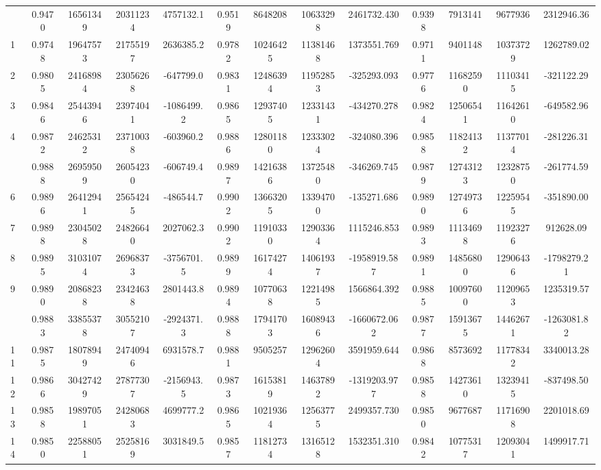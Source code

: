 \documentclass[
  12pt,
]{article}
\begin{document}
\begin{longtable}[t]{lcccccccccccc}
\endfoot
\bottomrule
\endlastfoot
0 & 0.9470 & 16561349 & 20311234 & 4757132.1 & 0.9519 & 8648208 & 10633298 & 2461732.430 & 0.9398 & 7913141 & 9677936 & 2312946.36\\
1 & 0.9748 & 19647573 & 21755197 & 2636385.2 & 0.9782 & 10246425 & 11381468 & 1373551.769 & 0.9711 & 9401148 & 10373729 & 1262789.02\\
2 & 0.9805 & 24168984 & 23056268 & -647799.0 & 0.9831 & 12486394 & 11952853 & -325293.093 & 0.9776 & 11682590 & 11103415 & -321122.29\\
3 & 0.9846 & 25443946 & 23974041 & -1086499.2 & 0.9865 & 12937405 & 12331431 & -434270.278 & 0.9824 & 12506541 & 11642610 & -649582.96\\
4 & 0.9872 & 24625312 & 23710038 & -603960.2 & 0.9886 & 12801180 & 12333024 & -324080.396 & 0.9858 & 11824132 & 11377014 & -281226.31\\
\addlinespace
5 & 0.9888 & 26959509 & 26054230 & -606749.4 & 0.9897 & 14216386 & 13725480 & -346269.745 & 0.9879 & 12743123 & 12328750 & -261774.59\\
6 & 0.9896 & 26412941 & 25654245 & -486544.7 & 0.9902 & 13663205 & 13394700 & -135271.686 & 0.9890 & 12749736 & 12259545 & -351890.00\\
7 & 0.9898 & 23045028 & 24826640 & 2027062.3 & 0.9902 & 11910330 & 12903364 & 1115246.853 & 0.9893 & 11134698 & 11923276 & 912628.09\\
8 & 0.9895 & 31031074 & 26968373 & -3756701.5 & 0.9899 & 16174274 & 14061937 & -1958919.587 & 0.9891 & 14856800 & 12906436 & -1798279.21\\
9 & 0.9890 & 20868238 & 23424638 & 2801443.8 & 0.9894 & 10770638 & 12214985 & 1566864.392 & 0.9885 & 10097600 & 11209653 & 1235319.57\\
\addlinespace
10 & 0.9883 & 33855378 & 30552107 & -2924371.3 & 0.9888 & 17941703 & 16089436 & -1660672.062 & 0.9877 & 15913675 & 14462671 & -1263081.82\\
11 & 0.9875 & 18078949 & 24740946 & 6931578.7 & 0.9881 & 9505257 & 12962604 & 3591959.644 & 0.9868 & 8573692 & 11778342 & 3340013.28\\
12 & 0.9866 & 30427429 & 27877307 & -2156943.5 & 0.9873 & 16153819 & 14637892 & -1319203.977 & 0.9858 & 14273610 & 13239415 & -837498.50\\
13 & 0.9858 & 19897051 & 24280683 & 4699777.2 & 0.9865 & 10219364 & 12563775 & 2499357.730 & 0.9850 & 9677687 & 11716908 & 2201018.69\\
14 & 0.9850 & 22588051 & 25258169 & 3031849.5 & 0.9857 & 11812734 & 13165128 & 1532351.310 & 0.9842 & 10775317 & 12093041 & 1499917.71\\

\end{longtable}
\end{document}
